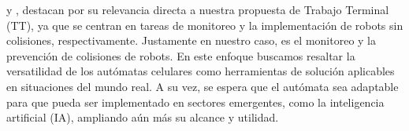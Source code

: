         y \cite{Lopes2023}, destacan por su relevancia directa a nuestra propuesta de Trabajo Terminal (TT), 
        ya que se centran en tareas de monitoreo y la implementaci\'on de robots sin colisiones, respectivamente. 
        Justamente en nuestro caso, es el monitoreo y la prevenci\'on de colisiones de robots.
    \vskip 0.5cm
    En este enfoque buscamos resaltar la versatilidad de los aut\'omatas celulares como herramientas de soluci\'on aplicables 
        en situaciones del mundo real. A su vez, se espera que el aut\'omata sea adaptable para que pueda ser implementado 
        en sectores emergentes, como la inteligencia artificial (IA), ampliando a\'un m\'as su alcance y utilidad.
    
    
\clearpage